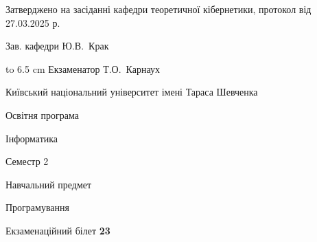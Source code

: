 \documentclass[12pt, ukrainian]{article}
\begin{document}
{\smallskip\smallskip \begin {scriptsize} Затверджено на засіданні кафедри теоретичної кібернетики, протокол   від   27.03.2025 р.\par\smallskip\smallskip\smallskip\smallskip
{\parbox {6.5 cm} {Зав. кафедри \dotfill Ю.В.~Крак}}\hspace {0.7cm} {\hbox to 6.5 cm { Екзаменатор \dotfill Т.О.~Карнаух}} \end{scriptsize}}
\newpage
{{\begin {scriptsize}\par
{ \center  Київський національний університет імені Тараса Шевченка \par}
{\parbox {5 cm}{Освітня програма \hfill}{\parbox {7 cm}{Інформатика\hfill}}\parbox {6 cm}{\hfill Семестр 2}}\par
{\parbox {5 cm} {Навчальний предмет \hfill}\parbox {7 cm}{Програмування \hfill}\parbox {6cm}{\hfill}\par}\vspace{-15pt} \end{scriptsize}}{\center Екзаменаційний білет \No \textbf { 23 }\par}}
\end{document}
